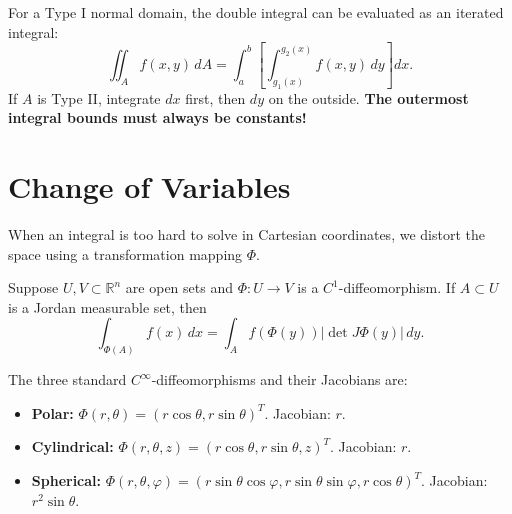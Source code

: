 \begin{theorem*}
For a Type I normal domain, the double integral can be evaluated as an iterated integral:
\[
\iint_A f(x, y) \, dA = \int_a^b \left[ \int_{g_1(x)}^{g_2(x)} f(x, y) \, dy \right] dx.
\]
If $A$ is Type II, integrate $dx$ first, then $dy$ on the outside. \textbf{The outermost integral bounds must always be constants!}
\end{theorem*}


\section{Change of Variables}

When an integral is too hard to solve in Cartesian coordinates, we distort the space using a transformation mapping $\Phi$.

\setcounter{savedSec}{\value{section}}
\setcounter{savedThm}{\value{theorem}}
\setcounter{section}{13}
\setcounter{theorem}{43} 

\begin{theorem}
Suppose $U, V \subset \mathbb{R}^n$ are open sets and $\Phi : U \to V$ is a $C^1$-diffeomorphism. If $A \subset U$ is a Jordan measurable set, then
\[
\int_{\Phi(A)} f(x) \, dx = \int_A f(\Phi(y)) |\det J\Phi(y)| \, dy.
\]
\end{theorem}

\setcounter{theorem}{44} 

\begin{theorem}
The three standard $C^\infty$-diffeomorphisms and their Jacobians are:
\begin{itemize}
    \item \textbf{Polar:} $\Phi(r, \theta) = (r\cos\theta, r\sin\theta)^T$. Jacobian: $r$.
    \item \textbf{Cylindrical:} $\Phi(r, \theta, z) = (r\cos\theta, r\sin\theta, z)^T$. Jacobian: $r$.
    \item \textbf{Spherical:} $\Phi(r, \theta, \varphi) = (r\sin\theta\cos\varphi, r\sin\theta\sin\varphi, r\cos\theta)^T$. Jacobian: $r^2\sin\theta$.
\end{itemize}
\end{theorem}

\setcounter{section}{\value{savedSec}}
\setcounter{theorem}{\value{savedThm}}


